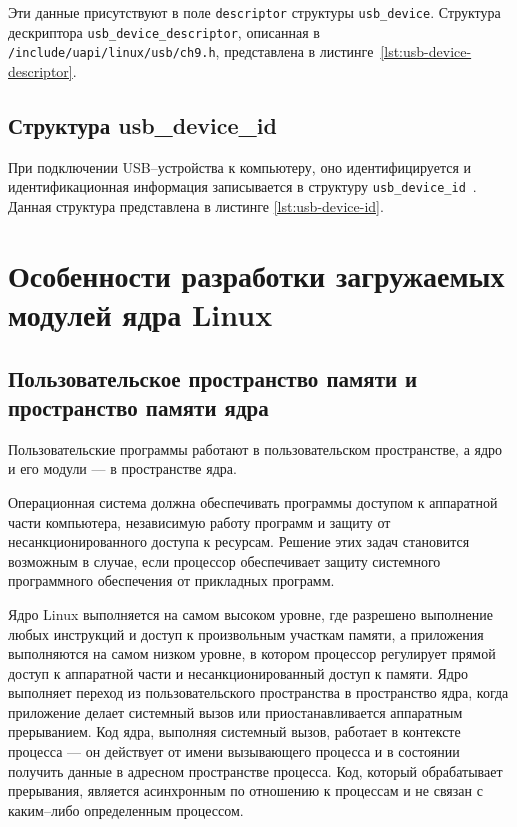 Эти данные присутствуют в поле \texttt{descriptor} структуры \texttt{usb\_device}. Структура дескриптора \texttt{usb\_device\_descriptor}, описанная в \texttt{/include/uapi/linux/usb/ch9.h}, представлена в листинге~\ref{lst:usb-device-descriptor}.


\subsection{Структура usb\_device\_id}

При подключении USB--устройства к компьютеру, оно идентифицируется и идентификационная информация записывается в структуру \texttt{usb\_device\_id}~\cite{usb_device_id}. Данная структура представлена в листинге \ref{lst:usb-device-id}.


\section{Особенности разработки загружаемых модулей ядра Linux}

\subsection{Пользовательское пространство памяти и пространство памяти ядра}

Пользовательские программы работают в пользовательском пространстве, а ядро и его модули --- в пространстве ядра.

Операционная система должна обеспечивать программы доступом к аппаратной части компьютера, независимую работу программ и защиту от несанкционированного доступа к ресурсам. Решение этих задач становится возможным в случае, если процессор обеспечивает защиту системного программного обеспечения от прикладных программ.

Ядро Linux выполняется на самом высоком уровне, где разрешено выполнение любых инструкций и доступ к произвольным участкам памяти, а приложения выполняются на самом низком уровне, в котором процессор регулирует прямой доступ к аппаратной части и несанкционированный доступ к памяти. Ядро выполняет переход из пользовательского пространства в пространство ядра, когда приложение делает системный вызов или приостанавливается аппаратным прерыванием. Код ядра, выполняя системный вызов, работает в контексте процесса --- он действует от имени вызывающего процесса и в состоянии получить данные в адресном пространстве процесса. Код, который обрабатывает прерывания, является асинхронным по отношению к процессам и не связан с каким--либо определенным процессом.

